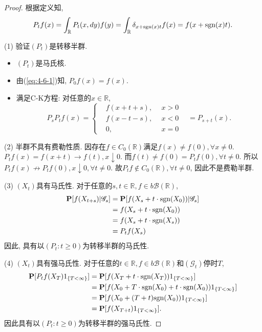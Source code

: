 \documentclass[UTF8,ondside]{ctexart}
\newcommand{\h}{\mathscr}
\newcommand{\kx}{\mathbb}
\newcommand{\mbf}{\mathbf}
\newcommand{\sgn}{\text{\rm sgn}}
\numberwithin{equation}{section}
\begin{document}
	\begin{proof}
		根据定义知, 
		\begin{equation}\label{eq:4-6-1}
			P_t f(x)=\int_{\kx R}P_t(x,dy)f(y)=\int_{\kx R}\delta_{x+\sgn(x)t} f(x)=f(x+\sgn(x)t).
		\end{equation}

		(1) 验证$(P_t)$是转移半群.
		\begin{itemize}
			\item $(P_t)$是马氏核.
			\item 由(\ref{eq:4-6-1})知, $P_0f(x)=f(x)$.
			\item 满足C-K方程: 对任意的$x\in \kx R$,
			\[
				P_s P_t f(x)=\left\{
					\begin{aligned}
					&f(x+t+s),&\ \ x>0\\
					&f(x-t-s),&\ \ x<0\\
					&0,&\ \ x=0			
					\end{aligned}
				\right.\ \ \ \ =P_{s+t}(x).
			\]
		\end{itemize}

		(2) 半群不具有费勒性质. 因存在$f\in C_0(\kx R)$满足$f(x)\neq f(0),\forall x\neq 0$. $P_t f(x) =f(x+t)\rightarrow f(t),x\downarrow 0$. 而$f(t)\neq f(0)=P_t f(0), \forall t\neq 0$. 所以$P_t f(x)\nrightarrow P_t f(0),x\downarrow 0, \forall t\neq 0$. 故$P_t f\notin C_0(\kx R),\forall t\neq 0$, 因此不是费勒半群. 

		(3) $(X_t)$具有马氏性. 对于任意的$s,t\in\kx R,f\in b\h B(\kx R)$,
		\[
			\begin{aligned}
			\mbf P[f(X_{t+s})|\h G_s]&=\mbf P[f(X_s + t\cdot\sgn(X_0))|\h G_s]\\
			&=f(X_s + t\cdot\sgn(X_0))\\
			&=f(X_s + t\cdot\sgn(X_s))\\
			&=P_t f(X_s)
			\end{aligned}
		\]
		因此, 具有以$(P_t:t\geq 0)$为转移半群的马氏性. 

		(4) $(X_t)$具有强马氏性. 对于任意的$t\in \kx R, f\in b\h B(\kx R)$和$(\h G_t)$停时$T$, 
		\[\begin{aligned}
			\mbf P[P_t f(X_T)1_{\{T<\infty\}}]
			&=\mbf P[f(X_T+t\cdot\sgn(X_T))1_{\{T<\infty\}}]\\
			&=\mbf P[f(X_0+T\cdot \sgn(X_0)+t\cdot\sgn(X_0))1_{\{T<\infty\}}]\\
			&=\mbf P[f(X_0+(T+t)\sgn(X_0))1_{\{T<\infty\}}]\\
			&=\mbf P[f(X_{T+t})1_{\{T<\infty\}}].
		\end{aligned}
		\]
		因此具有以$(P_t:t\geq 0)$为转移半群的强马氏性. 
	\end{proof}
\end{document}

